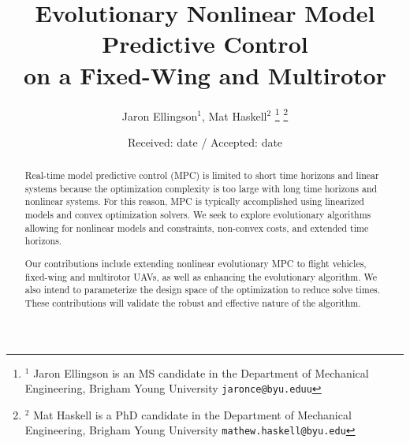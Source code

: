 \documentclass[letterpaper, 10 pt, conference]{ieeeconf}  %
\title{\LARGE \bf
	Evolutionary Nonlinear Model Predictive Control \\ on a Fixed-Wing and Multirotor
}
\author{Jaron Ellingson$^{1}$, Mat Haskell$^{2}$%
	\thanks{$^{1}$ Jaron Ellingson is an MS candidate in the Department of Mechanical Engineering, Brigham Young University
		{\tt\small jaronce@byu.eduu}}%
	\thanks{$^{2}$ Mat Haskell is a PhD candidate in the Department of Mechanical Engineering, Brigham Young University
		{\tt\small mathew.haskell@byu.edu}}%
}
\begin{document}
\maketitle
\thispagestyle{empty}
\pagestyle{empty}

\date{Received: date / Accepted: date}


\maketitle

\begin{abstract}
Real-time model predictive control (MPC) is limited to short time horizons and linear systems because the optimization complexity is too large with long time horizons and nonlinear systems. For this reason, MPC is typically accomplished using linearized models and convex optimization solvers. We seek to explore evolutionary algorithms allowing for nonlinear models and constraints, non-convex costs, and extended time horizons.

Our contributions include extending nonlinear evolutionary MPC to flight vehicles, fixed-wing and multirotor UAVs, as well as enhancing the evolutionary algorithm. We also intend to parameterize the design space of the optimization to reduce solve times. These contributions will validate the robust and effective nature of the algorithm.

\end{abstract}




\end{document}
